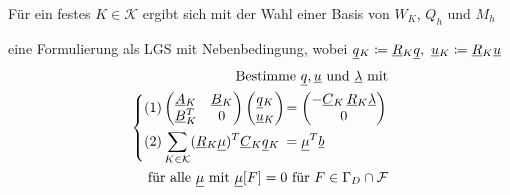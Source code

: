 Für ein festes $ K \in \mathcal{K} $ ergibt sich mit der Wahl einer Basis von $ W_K $, $ Q_h $ und $ M_h $ 

eine Formulierung als LGS mit Nebenbedingung, wobei $ \ubar{q}_K \coloneqq \ubar{R}_K \ubar{q}, \ \ubar{u}_K \coloneqq \ubar{R}_K \ubar{u} $
\begin{align*}
\text{Bestimme } \underline{q}{}, \underline{u}{} \text{ und } \underline{\lambda}{} \text{ mit}\\
\begin{dcases}
(1) \begin{pmatrix}
\underline{A}{}_K & \underline{B}{}_K \\
\underline{B}{}_K^T & 0
\end{pmatrix}
\begin{pmatrix}
\underline{q}{}_K\\
\underline{u}{}_K
\end{pmatrix}
\mkern-16mu&= \begin{pmatrix}
- \underline{C}{}_K \, \underline{R}{}_K \underline{\lambda}{} \\
0
\end{pmatrix}\\
(2) \sum_{K \in \mathcal{K}}  (\underline{R}{}_K \underline{\mu}{})^T \underline{C}{}_K \underline{q}{}_K \mkern-16mu&= \underline{\mu}{}^T \underline{b}{}		
\end{dcases}\\
\text{für alle } \underline{\mu}{} \text{ mit } \underline{\mu}{}[F] = 0 \text{ für } F \in \Gamma_D \cap \mathcal{F}
\end{align*}

